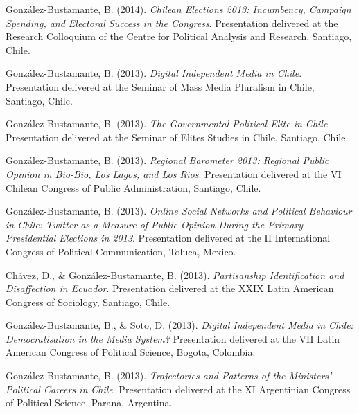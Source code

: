 \begin{publications}
\begin{benumerate}{66}
\item{\small González-Bustamante, B. (2014). {\itshape Chilean Elections 2013: Incumbency, Campaign Spending, and Electoral Success in the Congress}. Presentation delivered at the Research Colloquium of the Centre for Political Analysis and Research, Santiago, Chile.}\vspace{1mm}

\item{\small González-Bustamante, B. (2013). {\itshape Digital Independent Media in Chile}. Presentation delivered at the Seminar of Mass Media Pluralism in Chile, Santiago, Chile.}\vspace{1mm}

\item{\small González-Bustamante, B. (2013). {\itshape The Governmental Political Elite in Chile}. Presentation delivered at the Seminar of Elites Studies in Chile, Santiago, Chile.}\vspace{1mm}

\item{\small González-Bustamante, B. (2013). {\itshape Regional Barometer 2013: Regional Public Opinion in Bio-Bio, Los Lagos, and Los Rios}. Presentation delivered at the VI Chilean Congress of Public Administration, Santiago, Chile.}\vspace{1mm}

\item{\small González-Bustamante, B. (2013). {\itshape Online Social Networks and Political Behaviour in Chile: Twitter as a Measure of Public Opinion During the Primary Presidential Elections in 2013}. Presentation delivered at the II International Congress of Political Communication, Toluca, Mexico.}\vspace{1mm}

\item{\small Chávez, D., \& González-Bustamante, B. (2013). {\itshape Partisanship Identification and Disaffection in Ecuador}. Presentation delivered at the XXIX Latin American Congress of Sociology, Santiago, Chile.}\vspace{1mm}

\item{\small González-Bustamante, B., \& Soto, D. (2013). {\itshape Digital Independent Media in Chile: Democratisation in the Media System?} Presentation delivered at the VII Latin American Congress of Political Science, Bogota, Colombia.}\vspace{1mm}

\item{\small González-Bustamante, B. (2013). {\itshape Trajectories and Patterns of the Ministers' Political Careers in Chile}. Presentation delivered at the XI Argentinian Congress of Political Science, Parana, Argentina.}\vspace{1mm}


\end{benumerate}
\end{publications}
